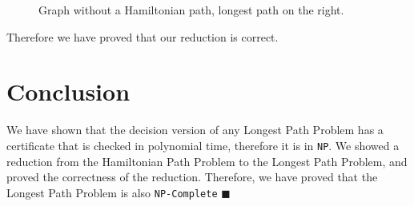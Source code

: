\documentclass[a4paper,11pt]{article}
\begin{document}
\begin{figure}[!h]
    \centering {}
    \caption{Graph without a Hamiltonian path, longest path on the right.}
\end{figure}

Therefore we have proved that our reduction is correct.

\section{Conclusion}

We have shown that the decision version of any Longest Path Problem has a
certificate that is checked in polynomial time, therefore it is in \verb|NP|. We
showed a reduction from the Hamiltonian Path Problem to the Longest Path
Problem, and proved the correctness of the reduction. Therefore, we have proved
that the Longest Path Problem is also \verb|NP-Complete| $\blacksquare$
\end{document}

